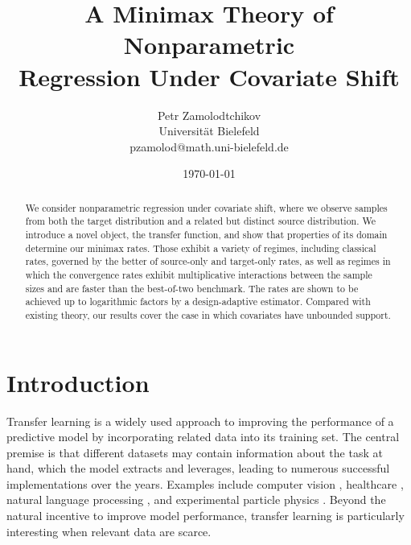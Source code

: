 \documentclass[10pt]{article}
\title{A Minimax Theory of Nonparametric \\Regression Under Covariate Shift}
\author{\large{Petr Zamolodtchikov}\vspace{.15cm}\\ Universit\"at Bielefeld\vspace{.05cm}\\
pzamolod@math.uni-bielefeld.de}
\date{\today}
\begin{document}
\maketitle

\begin{abstract}
    We consider nonparametric regression under covariate shift, where we observe samples from both the target distribution and a related but distinct source distribution. We introduce a novel object, the transfer function, and show that properties of its domain determine our minimax rates. Those exhibit a variety of regimes, including classical rates, governed by the better of source-only and target-only rates, as well as regimes in which the convergence rates exhibit multiplicative interactions between the sample sizes and are faster than the best-of-two benchmark. The rates are shown to be achieved up to logarithmic factors by a design-adaptive estimator. Compared with existing theory, our results cover the case in which covariates have unbounded support.
\end{abstract}

\begingroup
\renewcommand{\thefootnote}{}
\endgroup


\section{Introduction}
\label{sec.intro}

Transfer learning is a widely used approach to improving the performance of a predictive model by incorporating related data into its training set. The central premise is that different datasets may contain information about the task at hand, which the model extracts and leverages, leading to numerous successful implementations over the years. Examples include computer vision \cite{li2020transfer,wang2022transfer}, healthcare \cite{ali2021enhanced,ebbehoj2022transfer}, natural language processing \cite{ruder2019transfer}, and experimental particle physics \cite{mokhtar2025fine, camaiani2022model}. Beyond the natural incentive to improve model performance, transfer learning is particularly interesting when relevant data are scarce.\\
\end{document}

